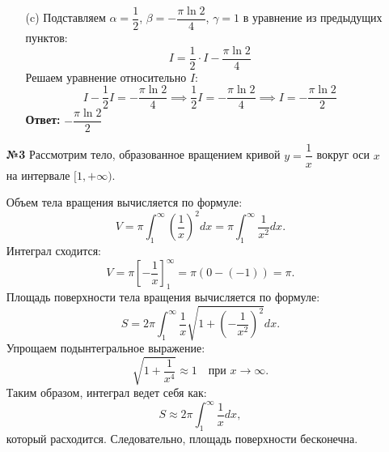 \documentclass[a4paper]{article}
\begin{document}
\begin{enumerate}
\begin{enumerate}
    \item[(c)]Подставляем \(\alpha = \dfrac{1}{2}\), \(\beta = 
    -\dfrac{\pi \ln 2}{4}\), \(\gamma = 1\) в уравнение из предыдущих пунктов:
    \[
    I = \dfrac{1}{2} \cdot I - \dfrac{\pi \ln 2}{4}
    \]
    Решаем уравнение относительно \(I\):
    \[
    I - \dfrac{1}{2}I = -\dfrac{\pi \ln 2}{4} \implies \dfrac{1}{2}I =
     -\dfrac{\pi \ln 2}{4} \implies I = -\dfrac{\pi \ln 2}{2}
    \]
    \textbf{Ответ: } $-\dfrac{\pi \ln 2}{2}$\\
  \end{enumerate}

  \item[\textbf{№3}]Рассмотрим тело, 
  образованное вращением кривой \( y = \dfrac{1}{x} \) 
  вокруг оси \( x \) на интервале \( [1, +\infty) \). 
  
  Объем тела вращения вычисляется по формуле:  
  \[
  V = \pi \int_{1}^{\infty} \left( \dfrac{1}{x} \right)^2 dx = \pi \int_{1}^{\infty} \dfrac{1}{x^2} dx.
  \]  
  Интеграл сходится:  
  \[
  V = \pi \left[ -\dfrac{1}{x} \right]_{1}^{\infty} = \pi \left( 0 - (-1) \right) = \pi.
  \]
  Площадь поверхности тела вращения вычисляется по формуле:  
  \[
  S = 2\pi \int_{1}^{\infty} \dfrac{1}{x} \sqrt{1 + \left( -\dfrac{1}{x^2} \right)^2 } dx.
  \]  
  Упрощаем подынтегральное выражение:  
  \[
  \sqrt{1 + \dfrac{1}{x^4}} \approx 1 \quad \text{при } x \to \infty.
  \]  
  Таким образом, интеграл ведет себя как:  
  \[
  S \approx 2\pi \int_{1}^{\infty} \dfrac{1}{x} dx,
  \]  
  который расходится. Следовательно, площадь поверхности бесконечна.

\end{enumerate}
\end{document}
